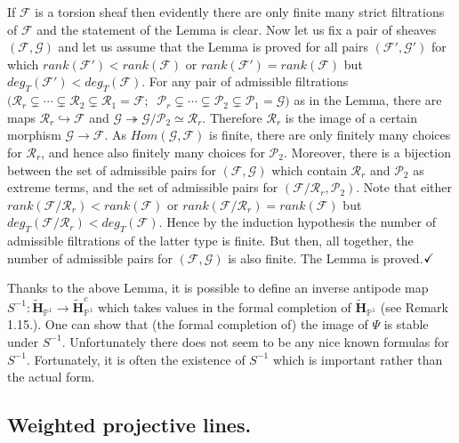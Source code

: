\documentclass[a4paper,10pt]{amsart}
\def\H{\mathbf{H}}
\def\qed{$\hfill \checkmark$}
\numberwithin{equation}{section}
\begin{document}
{If $\mathcal{F}$ is a torsion sheaf then evidently there are only finite many strict filtrations of $\mathcal{F}$ and the statement of the Lemma is clear. Now let us fix a pair of sheaves $(\mathcal{F},\mathcal{G})$ and let us assume that the Lemma is proved for all pairs $(\mathcal{F}',\mathcal{G}')$ for which $rank(\mathcal{F}')<rank(\mathcal{F})$ or $rank(\mathcal{F}')=rank(\mathcal{F})$ but $deg_T(\mathcal{F}')<deg_T(\mathcal{F})$. For any pair of admissible filtrations $\big( \mathcal{R}_r \subsetneq \cdots \subsetneq \mathcal{R}_2 \subsetneq \mathcal{R}_1=\mathcal{F}; \;\; \mathcal{P}_r \subsetneq \cdots \subsetneq \mathcal{P}_2 \subsetneq \mathcal{P}_1=\mathcal{G} \big)$ as in the Lemma, there are maps $\mathcal{R}_r \hookrightarrow \mathcal{F}$ and $\mathcal{G} \twoheadrightarrow \mathcal{G}/\mathcal{P}_2\simeq\mathcal{R}_r$. Therefore $\mathcal{R}_r$ is the image of a certain morphism $\mathcal{G} \to \mathcal{F}$. As ${Hom}(\mathcal{G}, \mathcal{F})$ is finite, there are only finitely many choices for $\mathcal{R}_r$, and hence also finitely many choices for $\mathcal{P}_2$. Moreover, there is a bijection between the set of admissible pairs for $(\mathcal{F},\mathcal{G})$ which contain $\mathcal{R}_r$ and $\mathcal{P}_2$ as extreme terms, and the set of admissible pairs for $(\mathcal{F}/\mathcal{R}_r,\mathcal{P}_2)$. Note that either $rank(\mathcal{F}/\mathcal{R}_r)<rank(\mathcal{F})$ or $rank(\mathcal{F}/\mathcal{R}_r)=rank(\mathcal{F})$ but $deg_T(\mathcal{F}/\mathcal{R}_r)<deg_T(\mathcal{F})$. Hence by the induction hypothesis the number of admissible filtrations of the latter type is finite. But then, all together, the number of admissible pairs for $(\mathcal{F},\mathcal{G})$ is also finite. The Lemma is proved.\qed

\vspace{.1in}

Thanks to the above Lemma, it is possible to define an inverse antipode map $S^{-1}: \widetilde{\H}_{\mathbb{P}^1} \to \widetilde{\H}_{\mathbb{P}^1}^c$ which takes values in the formal completion of $\widetilde{\H}_{\mathbb{P}^1}$ (see Remark 1.15.). One can show that (the formal completion of) the image of $\Psi$ is stable under $S^{-1}$. Unfortunately there does not seem to be any nice known formulas for $S^{-1}$. Fortunately, it is often the existence of $S^{-1}$ which is important rather than the actual form.

\vspace{.2in}

\subsection{Weighted projective lines.}


}
\end{document}
